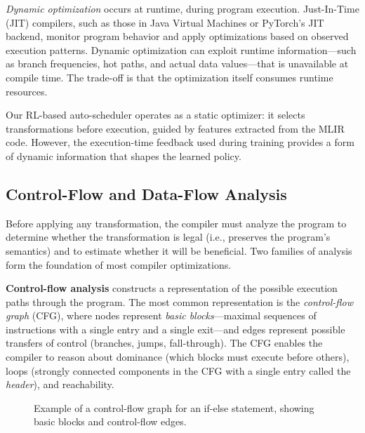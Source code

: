 \textit{Dynamic optimization} occurs at runtime, during program execution. Just-In-Time (JIT) compilers, such as those in Java Virtual Machines or PyTorch's JIT backend, monitor program behavior and apply optimizations based on observed execution patterns. Dynamic optimization can exploit runtime information—such as branch frequencies, hot paths, and actual data values—that is unavailable at compile time. The trade-off is that the optimization itself consumes runtime resources.

Our RL-based auto-scheduler operates as a static optimizer: it selects transformations before execution, guided by features extracted from the MLIR code. However, the execution-time feedback used during training provides a form of dynamic information that shapes the learned policy.

\subsection{Control-Flow and Data-Flow Analysis}

Before applying any transformation, the compiler must analyze the program to determine whether the transformation is legal (i.e., preserves the program's semantics) and to estimate whether it will be beneficial. Two families of analysis form the foundation of most compiler optimizations.

\textbf{Control-flow analysis} constructs a representation of the possible execution paths through the program. The most common representation is the \textit{control-flow graph} (CFG), where nodes represent \textit{basic blocks}—maximal sequences of instructions with a single entry and a single exit—and edges represent possible transfers of control (branches, jumps, fall-through). The CFG enables the compiler to reason about dominance (which blocks must execute before others), loops (strongly connected components in the CFG with a single entry called the \textit{header}), and reachability.

\begin{figure}[H]
    \centering
    \caption{Example of a control-flow graph for an if-else statement, showing basic blocks and control-flow edges.}
    \label{fig:cfg-example}
\end{figure}

